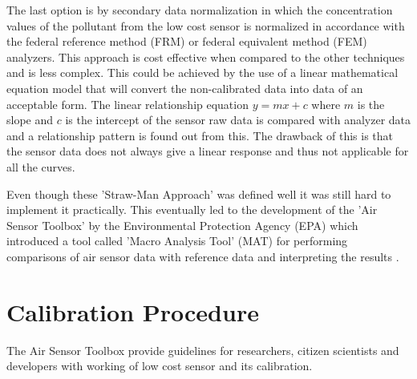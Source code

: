 \documentclass[12pt,a4paper,oneside]{report}
\begin{document}
The last option is by secondary data normalization in which the concentration values of the pollutant from the low cost sensor is normalized in accordance with the federal reference method (FRM) or federal equivalent method (FEM) analyzers. This approach is cost effective when compared to the other techniques and is less complex. This could be achieved by the use of a linear mathematical equation model that will convert the non-calibrated data into data of an acceptable form. The linear relationship equation $ y = mx + c $ where $ m $ is the slope and $ c $ is the intercept of the sensor raw data is compared with analyzer data and a relationship pattern is found out from this. The drawback of this is that the sensor data does not always give a linear response and thus not applicable for all the curves. 

Even though these 'Straw-Man Approach' was defined well it was still hard to implement it practically. This eventually led to the development of the 'Air Sensor Toolbox' by the Environmental Protection Agency (EPA) \cite{Williams2014} which introduced a tool called 'Macro Analysis Tool' (MAT) for performing comparisons of air sensor data with reference data and interpreting the results \cite{airsensorguidebook}.

\section*{Calibration Procedure}

The Air Sensor Toolbox provide guidelines for researchers, citizen scientists and developers with working of low cost sensor and its calibration.




\end{document}
